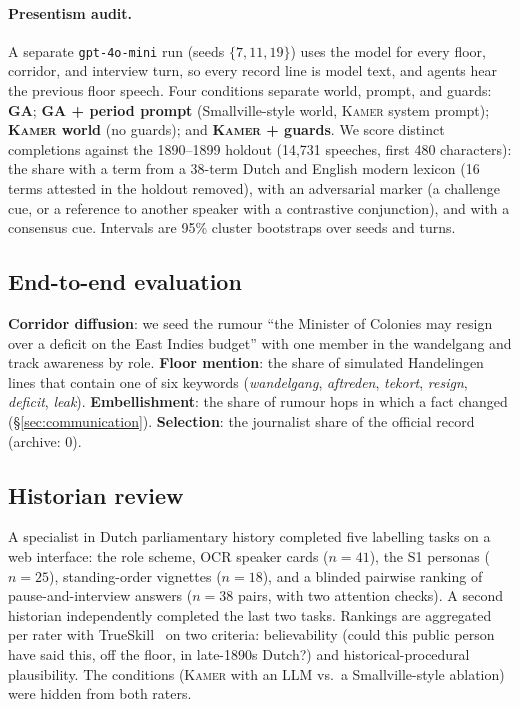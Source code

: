 \documentclass[sigconf,review,anonymous]{acmart}
\newcommand{\sys}{\textsc{Kamer}}
\begin{document}
\paragraph{Presentism audit.} A separate \texttt{gpt-4o-mini} run (seeds
$\{7,11,19\}$) uses the model for every floor, corridor, and interview
turn, so every record line is model text, and agents hear the previous
floor speech. Four conditions separate world, prompt, and guards:
\textbf{GA}; \textbf{GA + period prompt} (Smallville-style world, \sys{}
system prompt); \textbf{\sys{} world} (no guards); and
\textbf{\sys{} + guards}. We score distinct completions against the
1890--1899 holdout (14{,}731 speeches, first 480 characters): the share
with a term from a 38-term Dutch and English modern lexicon (16 terms
attested in the holdout removed), with an adversarial marker (a challenge
cue, or a reference to another speaker with a contrastive conjunction),
and with a consensus cue. Intervals are 95\% cluster bootstraps over
seeds and turns.

\subsection{End-to-end evaluation}
\label{sec:eval-e2e}
\textbf{Corridor diffusion}: we seed the rumour ``the Minister of Colonies
may resign over a deficit on the East Indies budget'' with one member in
the wandelgang and track awareness by role. \textbf{Floor mention}: the
share of simulated Handelingen lines that contain one of six keywords
(\emph{wandelgang}, \emph{aftreden}, \emph{tekort}, \emph{resign},
\emph{deficit}, \emph{leak}). \textbf{Embellishment}: the share of rumour
hops in which a fact changed (\S\ref{sec:communication}). \textbf{Selection}: the journalist
share of the official record (archive: $0$).

\subsection{Historian review}
\label{sec:eval-interview}
A specialist in Dutch parliamentary history completed five labelling tasks
on a web interface: the role scheme, OCR speaker cards ($n{=}41$), the S1
personas ($n{=}25$), standing-order vignettes ($n{=}18$), and a blinded
pairwise ranking of pause-and-interview answers ($n{=}38$ pairs, with two
attention checks). A second historian independently completed the last
two tasks. Rankings are aggregated per rater with
TrueSkill~\cite{herbrich2006trueskill} on two criteria: believability
(could this public person have said this, off the floor, in late-1890s
Dutch?) and historical-procedural plausibility. The conditions (\sys{} with
an LLM vs.\ a Smallville-style ablation) were hidden from both raters.
\end{document}

